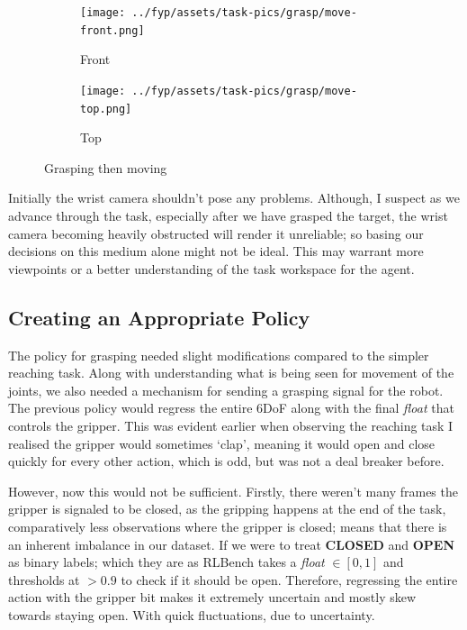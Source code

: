 \begin{figure}[htpb] %
  \centering
  \begin{subfigure}{0.45\linewidth}
    \centering
    \texttt{[image: ../fyp/assets/task-pics/grasp/move-front.png]} 
    \caption{Front}\label{subfig:grasp-move-front}
  \end{subfigure}
  \begin{subfigure}{0.45\linewidth}
    \centering
    \texttt{[image: ../fyp/assets/task-pics/grasp/move-top.png]}
    \caption{Top}\label{subfig:grasp-move-top}
  \end{subfigure}
  \caption{Grasping then moving}\label{fig:grasp-move}
\end{figure}



Initially the wrist camera shouldn't pose any problems. Although, I suspect as we advance through the task, especially after we have grasped the target, the wrist camera becoming heavily obstructed will render it unreliable; so basing our decisions on this medium alone might not be ideal. This may warrant more viewpoints or a better understanding of the task workspace for the agent. 

\subsection{Creating an Appropriate Policy}
The policy for grasping needed slight modifications compared to the simpler reaching task. Along with understanding what is being seen for movement of the joints, we also needed a mechanism for sending a grasping signal for the robot. The previous policy would regress the entire 6DoF along with the final \emph{float} that controls the gripper. This was evident earlier when observing the reaching task I realised the gripper would sometimes `clap', meaning it would open and close quickly for every other action, which is odd, but was not a deal breaker before.

However, now this would not be sufficient. Firstly, there weren't many frames the gripper is signaled to be closed, as the gripping happens at the end of the task, comparatively less observations where the gripper is closed; means that there is an inherent imbalance in our dataset. If we were to treat \textbf{CLOSED} and \textbf{OPEN} as binary labels; which they are as RLBench takes a \emph{float} $\in \left[0, 1\right]$ and thresholds at $ > 0.9$ to check if it should be open. Therefore, regressing the entire action with the gripper bit makes it extremely uncertain and mostly skew towards staying open. With quick fluctuations, due to uncertainty.

